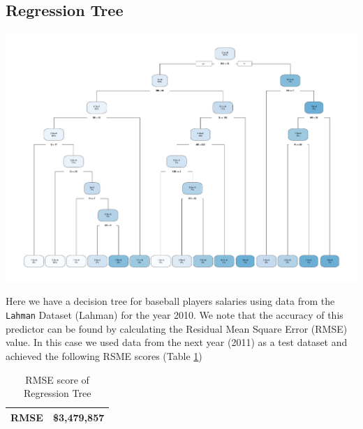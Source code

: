 \documentclass[11pt,a4paper]{report}
\begin{document}
\subsection{Regression Tree}
\begin{center}
    \includegraphics[width=0.7\linewidth]{finalplots/regtree.pdf}
    \label{fig:regtree}
\end{center}
Here we have a decision tree for baseball players salaries using data from the \texttt{Lahman} Dataset (Lahman) for the year 2010.
We note that the accuracy of this predictor can be found by calculating the Residual Mean Square Error (RMSE) value.
In this case we used data from the next year (2011) as a test dataset and achieved the following RSME scores (Table \ref{tab:regrsme})
\begin{table}
    \centering
    \begin{tabular}{|c|c|}
        \hline
        RMSE & \$3,479,857 \\
        \hline
    \end{tabular}
    \caption{RMSE score of Regression Tree}
    \label{tab:regrsme}
\end{table}
\end{document}
